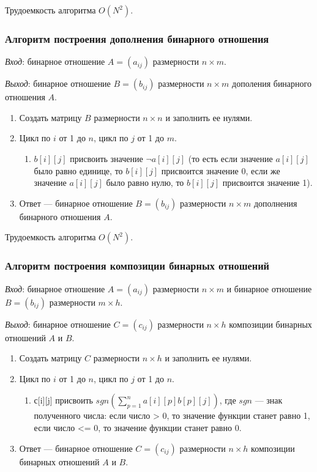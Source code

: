 \documentclass[bachelor, och, labwork]{shiza}
\begin{document}
Трудоемкость алгоритма $O(N^2)$.

\subsubsection{Алгоритм построения дополнения бинарного отношения}

\textit{Вход}: бинарное отношение $A=(a_{ij})$ размерности $n\times m$.

\textit{Выход}: бинарное отношение $B=(b_{ij})$ размерности $n\times m$ дополения
бинарного отношения $A$.

\begin{enumerate}
    \item Создать матрицу $B$ размерности $n\times n$ и заполнить ее нулями.
    \item Цикл по $i$ от 1 до $n$, цикл по $j$ от 1 до $m$.
    \begin{enumerate}
        \item $b[i][j]$ присвоить значение $\neg a[i][j]$ (то есть если значение
        $a[i][j]$ было равно единице, то $b[i][j]$ присвоится значение 0, если
        же значение $a[i][j]$ было равно нулю, то $b[i][j]$ присвоится значение 1).
    \end{enumerate}
    \item Ответ --- бинарное отношение $B=(b_{ij})$ размерности $n\times m$ дополнения
    бинарного отношения $A$.
\end{enumerate}

Трудоемкость алгоритма $O(N^2)$.

\subsubsection{Алгоритм построения композиции бинарных отношений}

\textit{Вход}: бинарное отношение $A=(a_{ij})$ размерности $n\times m$ и
бинарное отношение $B=(b_{ij})$ размерности $m\times h$.

\textit{Выход}: бинарное отношение $C=(c_{ij})$ размерности $n\times h$ композиции
бинарных отношений $A$ и $B$.

\begin{enumerate}
    \item Создать матрицу $C$ размерности $n\times h$ и заполнить ее нулями.
    \item Цикл по $i$ от 1 до $n$, цикл по $j$ от 1 до $n$.
    \begin{enumerate}
        \item с[i][j] присвоить $sgn(\sum_{p = 1}^{n}a[i][p]b[p][j])$, где $sgn$
        --- знак полученного числа: если число > 0, то значение функции станет равно
        1, если число <= 0, то значение функции станет равно 0.
    \end{enumerate}
    \item Ответ --- бинарное отношение $C=(c_{ij})$ размерности $n\times h$ композиции
    бинарных отношений $A$ и $B$.
\end{enumerate}
\end{document}
